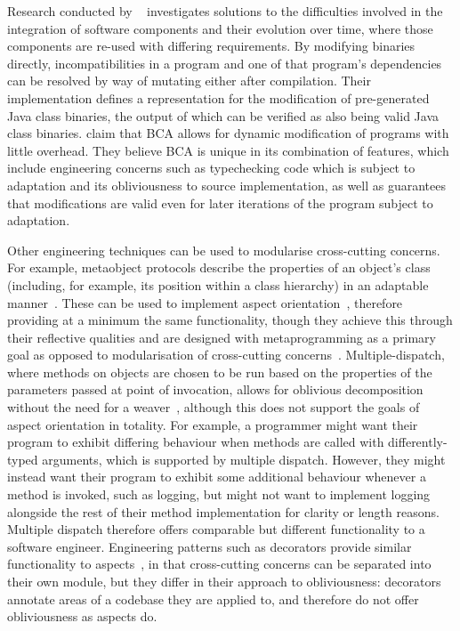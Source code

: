 Research conducted by ~\cite{keller1998binary}
investigates solutions to the difficulties involved in the integration of
software components and their evolution over time, where those components are
re-used with differing requirements. By modifying binaries directly,
incompatibilities in a program and one of that program's dependencies can be
resolved by way of mutating either after compilation. Their implementation
defines a representation for the modification of pre-generated Java class
binaries, the output of which can be verified as also being valid Java class
binaries.  claim that BCA allows for dynamic
modification of programs with little overhead. They believe BCA is unique in its
combination of features, which include engineering concerns such as typechecking
code which is subject to adaptation and its obliviousness to source
implementation, as well as guarantees that modifications are valid even for
later iterations of the program subject to adaptation.

Other engineering techniques can be used to modularise cross-cutting concerns.
For example, metaobject protocols describe the properties of an object's class
(including, for example, its position within a class hierarchy) in an adaptable
manner~\cite{kiczales1991art}. These can be used to implement aspect
orientation~\cite{espakaspect}, therefore providing at a minimum the same
functionality, though they achieve this through their reflective qualities and
are designed with metaprogramming as a primary goal as opposed to modularisation
of cross-cutting concerns~\cite{kiczales1991art,sullivan2001aspect}.
Multiple-dispatch, where methods on objects are chosen to be run based on the
properties of the parameters passed at point of invocation, allows for oblivious
decomposition without the need for a weaver~\cite{dozsa2008lisp}, although this
does not support the goals of aspect orientation in totality. For example, a
programmer might want their program to exhibit differing behaviour when methods
are called with differently-typed arguments, which is supported by multiple
dispatch. However, they might instead want their program to exhibit some
additional behaviour whenever a method is invoked, such as logging, but might
not want to implement logging alongside the rest of their method implementation
for clarity or length reasons. Multiple dispatch therefore offers comparable but
different functionality to a software engineer. Engineering patterns such as
decorators provide similar functionality to
aspects~\cite{friesel2017annotations}, in that cross-cutting concerns can be
separated into their own module, but they differ in their approach to
obliviousness: decorators annotate areas of a codebase they are applied to, and
therefore do not offer obliviousness as aspects do. 

